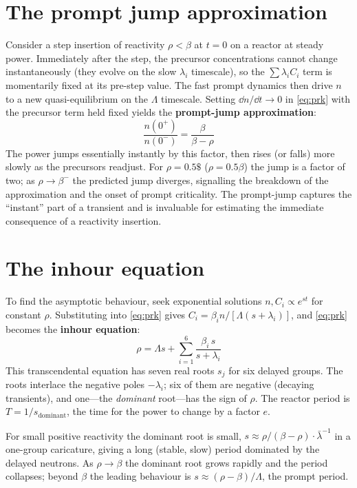\section{The prompt jump approximation}

Consider a step insertion of reactivity $\rho<\beta$ at $t=0$ on a reactor at
steady power. Immediately after the step, the precursor concentrations cannot
change instantaneously (they evolve on the slow $\lambda_i$ timescale), so the
$\sum\lambda_iC_i$ term is momentarily fixed at its pre-step value. The fast
prompt dynamics then drive $n$ to a new quasi-equilibrium on the $\Lambda$
timescale. Setting $\dd n/\dd t\to 0$ in \eqref{eq:prk} with the precursor term
held fixed yields the \textbf{prompt-jump approximation}:
\begin{equation}
\boxed{\ \frac{n(0^+)}{n(0^-)} = \frac{\beta}{\beta-\rho}\ }
\label{eq:promptjump}
\end{equation}
The power jumps essentially instantly by this factor, then rises (or falls) more
slowly as the precursors readjust. For $\rho=0.5\$$ ($\rho=0.5\beta$) the jump is
a factor of two; as $\rho\to\beta^-$ the predicted jump diverges, signalling the
breakdown of the approximation and the onset of prompt criticality. The
prompt-jump captures the ``instant'' part of a transient and is invaluable for
estimating the immediate consequence of a reactivity insertion.

\section{The inhour equation}

To find the asymptotic behaviour, seek exponential solutions $n,C_i\propto
e^{st}$ for constant $\rho$. Substituting into \eqref{eq:prk} gives
$C_i = \beta_i n/[\Lambda(s+\lambda_i)]$, and \eqref{eq:prk} becomes the
\textbf{inhour equation}:
\begin{equation}
\boxed{\ \rho = \Lambda s + \sum_{i=1}^{6}\frac{\beta_i\, s}{s+\lambda_i}\ }
\label{eq:inhour}
\end{equation}
This transcendental equation has seven real roots $s_j$ for six delayed groups.
The roots interlace the negative poles $-\lambda_i$; six of them are negative
(decaying transients), and one---the \emph{dominant} root---has the sign of
$\rho$. The reactor period is $T=1/s_{\text{dominant}}$, the time for the power to
change by a factor $e$.

For small positive reactivity the dominant root is small, $s\approx
\rho/(\beta-\rho)\cdot \bar\lambda^{-1}$ in a one-group caricature, giving a long
(stable, slow) period dominated by the delayed neutrons. As $\rho\to\beta$ the
dominant root grows rapidly and the period collapses; beyond $\beta$ the leading
behaviour is $s\approx(\rho-\beta)/\Lambda$, the prompt period.

